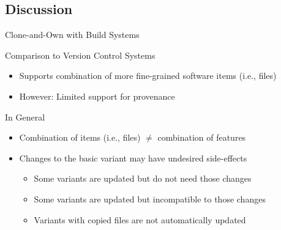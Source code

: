 \subsection{Discussion}

\begin{frame}{Clone-and-Own with Build Systems}
	\vspace{-\textheightoftitle}
	\begin{mycolumns}[b,animation=none]
		\begin{note}{Comparison to Version Control Systems}
			\begin{itemize}
				\item Supports combination of more fine-grained software items (i.e., files)
				\item However: Limited support for provenance
			\end{itemize}
		\end{note}
		\begin{note}{In General}
			\begin{itemize}
				\item Combination of items (i.e., files) $\neq$ combination of features
				\item Changes to the basic variant may have undesired side-effects
					\begin{itemize}
						\item Some variants are updated but do not need those changes
						\item Some variants are updated but incompatible to those changes
						\item Variants with copied files are not automatically updated
					\end{itemize}
			\end{itemize}
		\end{note}
	\mynextcolumn
		\centering{}
	\end{mycolumns}
\end{frame}
